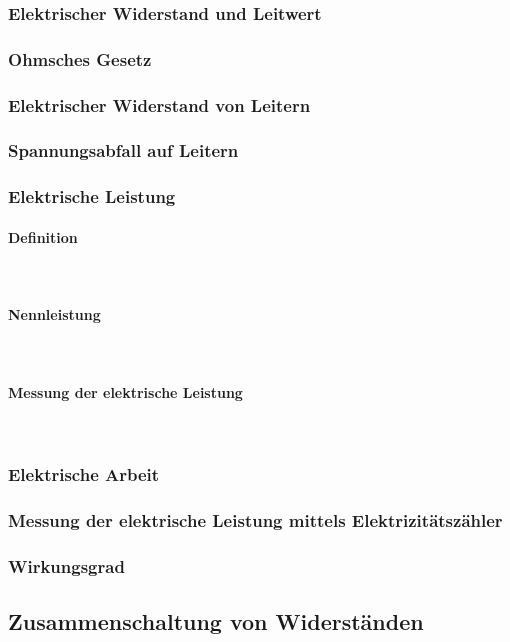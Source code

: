 	\subsubsection{Elektrischer Widerstand und Leitwert}
	\subsubsection{Ohmsches Gesetz}
	\subsubsection{Elektrischer Widerstand von Leitern}
	\subsubsection{Spannungsabfall auf Leitern}
	\subsubsection{Elektrische Leistung}
		\paragraph{Definition}~\\
		\paragraph{Nennleistung}~\\
		\paragraph{Messung der elektrische Leistung}~\\
	\subsubsection{Elektrische Arbeit}
	\subsubsection{Messung der elektrische Leistung mittels Elektrizitätszähler}
	\subsubsection{Wirkungsgrad}
	

\subsection{Zusammenschaltung von Widerständen}

